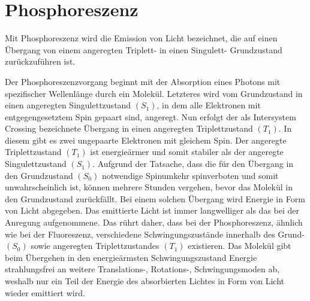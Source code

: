 \section{Phosphoreszenz}

Mit Phosphoreszenz wird die Emission von Licht bezeichnet, die auf einen Übergang von einem angeregten Triplett- in einen Singulett- Grundzustand zurückzuführen ist. 

Der Phosphoreszenzvorgang beginnt mit der Absorption eines Photons mit spezifischer Wellenlänge durch ein Molekül. Letzteres wird vom Grundzustand in einen angeregten Singulettzustand $(S_1)$, in dem alle Elektronen mit entgegengesetztem Spin gepaart sind, angeregt. Nun erfolgt der als Intersystem Crossing bezeichnete Übergang in einen angeregten Triplettzustand $(T_1)$. In diesem gibt es zwei ungepaarte Elektronen mit gleichem Spin. Der angeregte Triplettzustand $(T_1)$ ist energieärmer und somit stabiler als der angeregte Singulettzustand $(S_1)$. Aufgrund der Tatsache, dass die für den Übergang in den Grundzustand $(S_0)$ notwendige Spinumkehr spinverboten und somit unwahrscheinlich ist, können mehrere Stunden vergehen, bevor das Molekül in den Grundzustand zurückfällt. Bei einem solchen Übergang wird Energie in Form von Licht abgegeben. Das emittierte Licht ist immer langwelliger als das bei der Anregung aufgenommene. Das rührt daher, dass bei der Phosphoreszenz, ähnlich wie bei der Fluoreszenz, verschiedene Schwingungszustände innerhalb des Grund- $(S_0)$ sowie angeregten Triplettzustandes $(T_1)$ existieren. Das Molekül gibt beim Übergehen in den energieärmsten Schwingungszustand Energie strahlungsfrei an weitere Translations-, Rotations-, Schwingungsmoden ab, weshalb nur ein Teil der Energie des absorbierten Lichtes in Form von Licht wieder emittiert wird.
